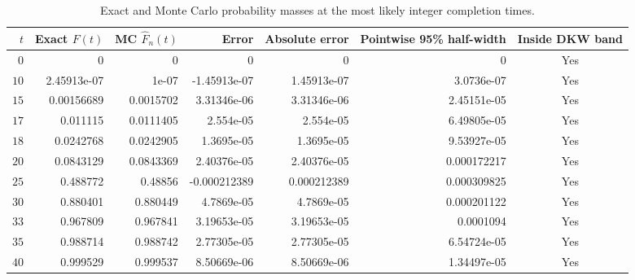 \documentclass[11pt,a4paper]{article}
\newcommand{\1}{\mathbf{1}}
\theoremstyle{definition}
\theoremstyle{plain}
\theoremstyle{remark}
\numberwithin{equation}{section}
\begin{document}
\begin{table}[H]
\centering
\caption{Exact and Monte Carlo probability masses at the most likely integer completion times.}
\label{tab:selected_discrete_pmf_values}

\begin{adjustbox}{max width=\linewidth}
\begin{tabular}{rrrrrrc}
\toprule
$t$ & Exact $F(t)$ & MC $\widehat F_n(t)$ & Error & Absolute error & Pointwise 95\% half-width & Inside DKW band \\
\midrule
$0$ & 0 & 0 & 0 & 0 & 0 & Yes \\
$10$ & 2.45913e-07 & 1e-07 & -1.45913e-07 & 1.45913e-07 & 3.0736e-07 & Yes \\
$15$ & 0.00156689 & 0.0015702 & 3.31346e-06 & 3.31346e-06 & 2.45151e-05 & Yes \\
$17$ & 0.011115 & 0.0111405 & 2.554e-05 & 2.554e-05 & 6.49805e-05 & Yes \\
$18$ & 0.0242768 & 0.0242905 & 1.3695e-05 & 1.3695e-05 & 9.53927e-05 & Yes \\
$20$ & 0.0843129 & 0.0843369 & 2.40376e-05 & 2.40376e-05 & 0.000172217 & Yes \\
$25$ & 0.488772 & 0.48856 & -0.000212389 & 0.000212389 & 0.000309825 & Yes \\
$30$ & 0.880401 & 0.880449 & 4.7869e-05 & 4.7869e-05 & 0.000201122 & Yes \\
$33$ & 0.967809 & 0.967841 & 3.19653e-05 & 3.19653e-05 & 0.0001094 & Yes \\
$35$ & 0.988714 & 0.988742 & 2.77305e-05 & 2.77305e-05 & 6.54724e-05 & Yes \\
$40$ & 0.999529 & 0.999537 & 8.50669e-06 & 8.50669e-06 & 1.34497e-05 & Yes \\
\bottomrule
\end{tabular}
\end{adjustbox}

\end{table}
\end{document}
